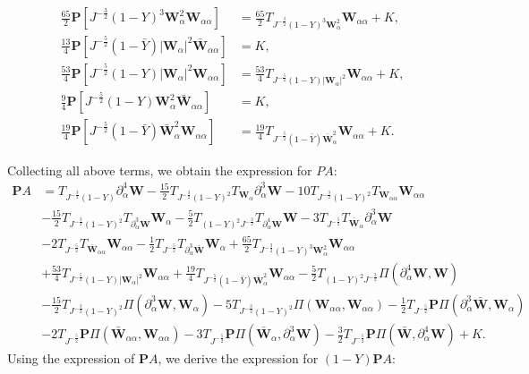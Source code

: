 \documentclass[10pt]{amsart}
\theoremstyle{remark}
\theoremstyle{definition}
\numberwithin{equation}{section}
\newcommand{\p}{\partial}
\newcommand{\al}{\alpha}
\newcommand{\f}{\frac}
\newcommand{\bw}{\mathbf{W}}
\newcommand{\nP}{{\mathbf P}}
\begin{document}
\begin{align*}
\f{65}{2}\nP[J^{-\f32}(1-Y)^3\bw_{\al}^2\bw_{\al\al}] 
    &= \f{65}{2}T_{J^{-\f32}(1-Y)^3\bw_{\al}^2}\bw_{\al\al} + K,\\
\f{13}{4}\nP[J^{-\f52}(1-\bar{Y})|\bw_{\al}|^2\bar{\bw}_{\al\al}] 
    &= K ,\\
\f{53}{4} \nP[J^{-\f52}(1-Y)|\bw_{\al}|^2\bw_{\al\al}] 
    &= \f{53}{4}T_{J^{-\f52}(1-Y)|\bw_{\al}|^2}\bw_{\al\al} + K,\\
\f{9}{4}\nP [J^{-\f52}(1-Y)\bw^2_\al\bar{\bw}_{\al\al}] 
    &= K,\\
\f{19}{4} \nP [J^{-\f52}(1-\bar{Y})\bar{\bw}_{\al}^2\bw_{\al\al}] 
    &= \f{19}{4}T_{J^{-\f52}(1-\bar{Y})\bar{\bw}_{\al}^2}\bw_{\al\al} +K.
\end{align*}

Collecting all above terms, we obtain the expression for $PA$:
\begin{align*}
\nP A
&=T_{J^{-\f32}(1-Y)}\p^4_{\al}\bw-\f{15}{2}T_{J^{-\f32}(1-Y)^2}T_{\bw_{\al}}\p^{3}_{\al}\bw -10T_{J^{-\f32}(1-Y)^2}T_{\bw_{\al\al}}\bw_{\al\al}\\
&-\f{15}{2}T_{J^{-\f32}(1-Y)^2}T_{\p^3_{\al}\bw}\bw_{\al} -\f52 T_{(1-Y)^2J^{-\f32}}T_{\p^4_{\al}\bw} \bw-3 T_{J^{-\f52}}T_{\bar{\bw}_{\al}}\p^3_{\al}\bw \\
&-2 T_{J^{-\f52}}T_{\bar{\bw}_{\al\al}}\bw_{\al\al}-\f12 T_{J^{-\f52}}T_{\p^3_{\al}\bar{\bw}}
\bw_{\al} +\f{65}{2}T_{J^{-\f32}(1-Y)^3\bw_{\al}^2}\bw_{\al\al}\\
&+\f{53}{4}T_{J^{-\f52}(1-Y)|\bw_{\al}|^2}\bw_{\al\al}+\f{19}{4}T_{J^{-\f52}(1-\bar{Y})\bar{\bw}_{\al}^2}\bw_{\al\al} -\f52 T_{(1-Y)^2J^{-\f32}}\Pi(\p^4_{\al}\bw,\bw)\\
& -\f{15}{2}T_{J^{-\f32}(1-Y)^2}\Pi(\p^3_{\al}\bw,\bw_{\al})-5 T_{J^{-\f32}(1-Y)^2}\Pi(\bw_{\al\al},\bw_{\al\al}) -\f12 T_{J^{-\f52}}\nP\Pi(\p^3_{\al}\bar{\bw},
\bw_{\al}) \\
&-2 T_{J^{-\f52}}\nP\Pi(\bar{\bw}_{\al\al},
\bw_{\al\al}) -3 T_{J^{-\f52}}\nP\Pi(\bar{\bw}_{\al}, \p^3_{\al}\bw)-\f32 T_{J^{-\f52}}\nP\Pi(\bar{\bw}, \p^4_{\al}\bw)+K.
\end{align*}
Using the expression of $\nP A$, we derive the expression for $(1-Y)\nP A$:
\end{document}
